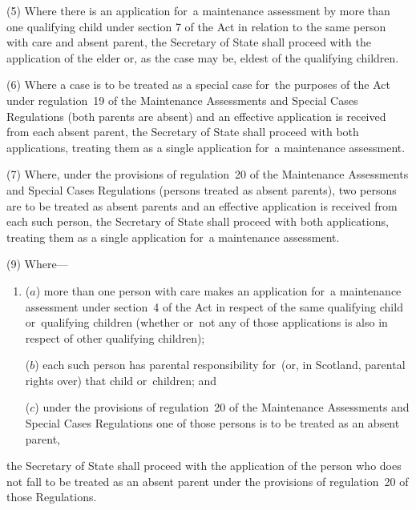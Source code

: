 \documentclass[a4paper,12pt]{article}
\begin{document}
(5) Where there is an application for~a maintenance assessment by more than one qualifying child under section 7 of the Act in relation to the same person with care and absent parent, 
the Secretary of State  %
shall proceed with the application of the elder or, as the case may be, eldest of the qualifying children.

(6) Where a case is to be treated as a special case for~the purposes of the Act under regulation~19 of the Maintenance Assessments and Special Cases Regulations (both parents are absent) and an effective application is received from each absent parent, 
the Secretary of State  %
shall proceed with both applications, treating them as a single application for~a maintenance assessment.

(7) Where, under the provisions of regulation~20 of the Maintenance Assessments and Special Cases Regulations (persons treated as absent parents), two persons are to be treated as absent parents and an effective application is received from each such person, 
the Secretary of State  %
shall proceed with both applications, treating them as a single application for~a maintenance assessment.


(9) Where—
\begin{enumerate}\item[]
($a$) more than one person with care makes an application for~a maintenance assessment under section~4 of the Act in respect of the same qualifying child or~qualifying children (whether or~not any of those applications is also in respect of other qualifying children);

\begin{sloppypar}
($b$) each such person has parental responsibility for~(or, in Scotland, parental rights over) that child or~children; and
\end{sloppypar}

($c$) under the provisions of regulation~20 of the Maintenance Assessments and Special Cases Regulations one of those persons is to be treated as an absent parent,
\end{enumerate}
the Secretary of State  %
shall proceed with the application of the person who does not fall to be treated as an absent parent under the provisions of regulation~20 of those Regulations.
\end{document}
